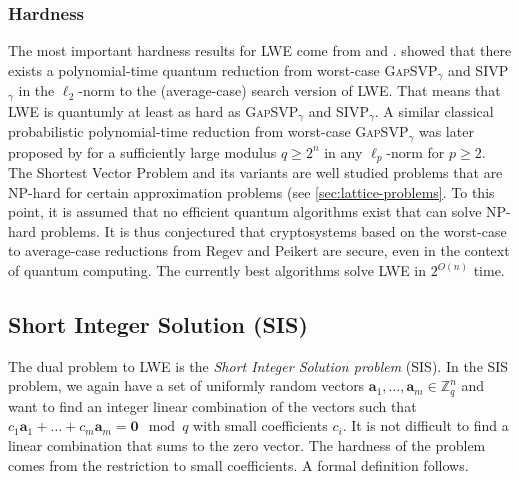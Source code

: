 \subsubsection{Hardness} \label{sec:lwe-hardness}
The most important hardness results for LWE come from \cite{Reg05} and \cite{Pei09}. \citet{Reg05} showed that there exists a polynomial-time quantum reduction from worst-case \textsc{GapSVP}$_\gamma$ and SIVP$_\gamma$ in the $\ell_2$-norm to the (average-case) search version of LWE. That means that LWE is quantumly at least as hard as \textsc{GapSVP}$_\gamma$ and SIVP$_\gamma$. A similar classical probabilistic polynomial-time reduction from worst-case \textsc{GapSVP}$_\gamma$ was later proposed by \citet{Pei09} for a sufficiently large modulus $q\geq 2^n$ in any $\ell_p$-norm for $p \geq 2$. The Shortest Vector Problem and its variants are well studied problems that are NP-hard for certain approximation problems (see \cref{sec:lattice-problems}. To this point, it is assumed that no efficient quantum algorithms exist that can solve NP-hard problems. It is thus conjectured that cryptosystems based on the worst-case to average-case reductions from Regev and Peikert are secure, even in the context of quantum computing. The currently best algorithms solve LWE in $2^{O(n)}$ time.




\subsection{Short Integer Solution (SIS)}
The dual problem to LWE is the \textit{Short Integer Solution problem} (SIS).
In the SIS problem, we again have a set of uniformly random vectors $\mathbf{a}_1, \ldots, \mathbf{a}_m \in \mathbb{Z}_q^n$ and want to find an integer linear combination of the vectors such that $c_1 \mathbf{a}_1 + \dots  + c_m \mathbf{a}_m = \mathbf{0} \mod q$ with small coefficients $c_i$. It is not difficult to find a linear combination that sums to the zero vector. The hardness of the problem comes from the restriction to small coefficients. A formal definition follows. %


